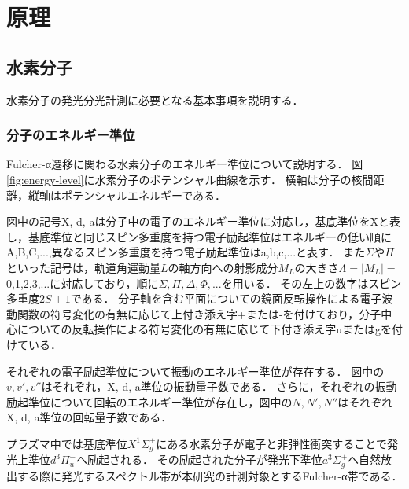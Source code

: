 \chapter{原理}

\section{水素分子}
水素分子の発光分光計測に必要となる基本事項を説明する．
\subsection{分子のエネルギー準位}
Fulcher-α遷移に関わる水素分子のエネルギー準位について説明する．
図\ref{fig:energy-level}に水素分子のポテンシャル曲線を示す．
横軸は分子の核間距離，縦軸はポテンシャルエネルギーである．

図中の記号X, d, aは分子中の電子のエネルギー準位に対応し，基底準位をXと表し，基底準位と同じスピン多重度を持つ電子励起準位はエネルギーの低い順にA,B,C,...,異なるスピン多重度を持つ電子励起準位はa,b,c,...と表す．
また$\Sigma$や$\Pi$といった記号は，軌道角運動量$L$の軸方向への射影成分$M_L$の大きさ$\Lambda = |M_L|=$0,1,2,3,...に対応しており，順に$\Sigma,\Pi,\Delta,\Phi,...$を用いる\cite{bunsibunko-no-kiso}．
その左上の数字はスピン多重度$2S+1$である\cite{bunsibunko-no-kiso}．
分子軸を含む平面についての鏡面反転操作による電子波動関数の符号変化の有無に応じて上付き添え字+または-を付けており，分子中心についての反転操作による符号変化の有無に応じて下付き添え字uまたはgを付けている\cite{bunsibunko-no-kiso}．

それぞれの電子励起準位について振動のエネルギー準位が存在する．
図中の$v, v', v''$はそれぞれ，X, d, a準位の振動量子数である．
さらに，それぞれの振動励起準位について回転のエネルギー準位が存在し，図中の$N, N', N''$はそれぞれX, d, a準位の回転量子数である．

プラズマ中では基底準位$X^1 \Sigma^+_g$にある水素分子が電子と非弾性衝突することで発光上準位$d^3 \Pi^-_u$へ励起される．
その励起された分子が発光下準位$a^3 \Sigma^+_g$へ自然放出する際に発光するスペクトル帯が本研究の計測対象とするFulcher-α帯である．

